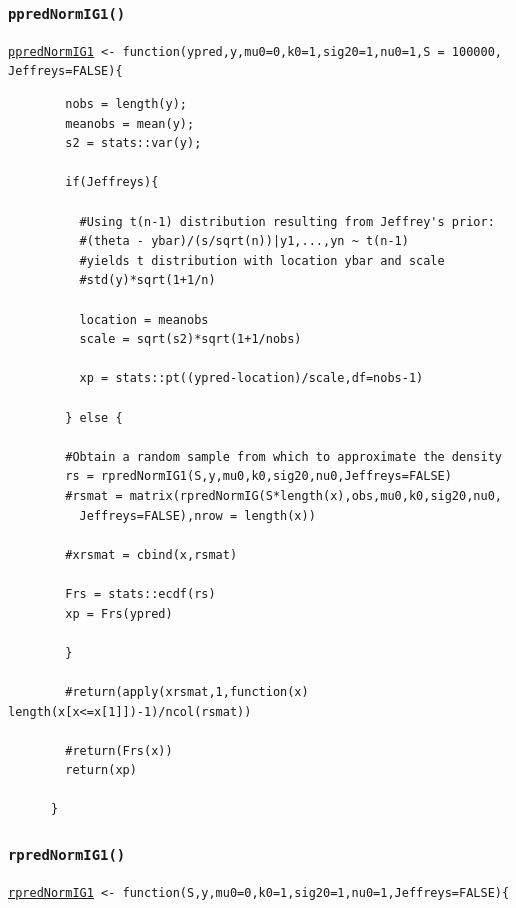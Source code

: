 \documentclass[12pt, a4paper]{article}
\begin{document}
    \subsubsection{\texttt{ppredNormIG1()}}\label{sec:ppredNormIG1}

    \texttt{\hyperref[sec:NormIG1imp]{ppredNormIG1} <- function(ypred,y,mu0=0,k0=1,sig20=1,nu0=1,S = 100000,
          Jeffreys=FALSE)\{ }

    \begin{verbatim}
        nobs = length(y);
        meanobs = mean(y);
        s2 = stats::var(y);

        if(Jeffreys){

          #Using t(n-1) distribution resulting from Jeffrey's prior:
          #(theta - ybar)/(s/sqrt(n))|y1,...,yn ~ t(n-1)
          #yields t distribution with location ybar and scale
          #std(y)*sqrt(1+1/n)

          location = meanobs
          scale = sqrt(s2)*sqrt(1+1/nobs)

          xp = stats::pt((ypred-location)/scale,df=nobs-1)

        } else {

        #Obtain a random sample from which to approximate the density
        rs = rpredNormIG1(S,y,mu0,k0,sig20,nu0,Jeffreys=FALSE)
        #rsmat = matrix(rpredNormIG(S*length(x),obs,mu0,k0,sig20,nu0,
          Jeffreys=FALSE),nrow = length(x))

        #xrsmat = cbind(x,rsmat)

        Frs = stats::ecdf(rs)
        xp = Frs(ypred)

        }

        #return(apply(xrsmat,1,function(x) length(x[x<=x[1]])-1)/ncol(rsmat))

        #return(Frs(x))
        return(xp)

      }
    \end{verbatim}

    \subsubsection{\texttt{rpredNormIG1()}}\label{sec:rpredNormIG1}

    \texttt{\hyperref[sec:NormIG1imp]{rpredNormIG1} <- function(S,y,mu0=0,k0=1,sig20=1,nu0=1,Jeffreys=FALSE)\{ }
\end{document}
